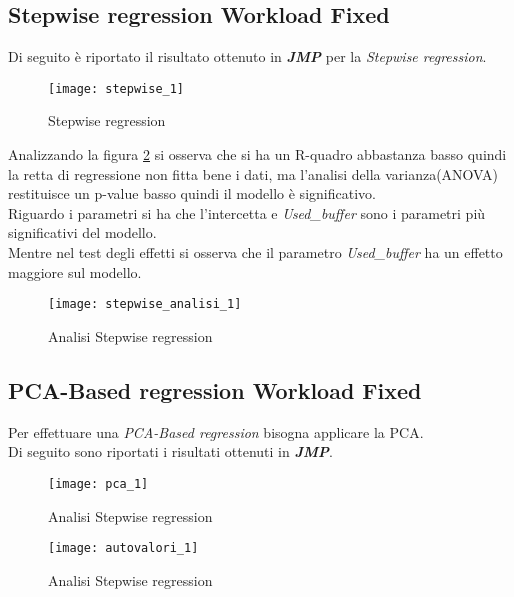 \clearpage

\subsection{Stepwise regression Workload Fixed}

Di seguito è riportato il risultato ottenuto in \textbf{\textit{JMP}} per
la \textit{Stepwise regression}.\\

\begin{figure}[!htbp]
  \centering
  \texttt{[image: stepwise\_1]}
  \caption{Stepwise regression}
  \label{stepwise_1}
\end{figure}
\clearpage
Analizzando la figura \ref{stepwise_analisi_1} si osserva che si ha un R-quadro
abbastanza basso quindi la retta di regressione non fitta bene i dati, ma l'analisi
della varianza(ANOVA) restituisce un p-value basso quindi il modello è significativo.\\
Riguardo i parametri si ha che l'intercetta e \textit{Used\_buffer} sono i parametri più significativi
del modello.\\
Mentre nel test degli effetti si osserva che il parametro \textit{Used\_buffer}
ha un effetto maggiore sul modello.\\
\begin{figure}[!htbp]
  \centering
  \texttt{[image: stepwise\_analisi\_1]}
  \caption{Analisi Stepwise regression}
  \label{stepwise_analisi_1}
\end{figure}

\clearpage

\subsection{PCA-Based regression Workload Fixed}

Per effettuare una \textit{PCA-Based regression} bisogna applicare la PCA.\\
Di seguito sono riportati i risultati ottenuti in \textbf{\textit{JMP}}.\\

\begin{figure}[!htbp]
  \centering
  \texttt{[image: pca\_1]}
  \caption{Analisi Stepwise regression}
  \label{pca_1}
\end{figure}

\begin{figure}[!htbp]
  \centering
  \texttt{[image: autovalori\_1]}
  \caption{Analisi Stepwise regression}
  \label{autovalori_1}
\end{figure}


